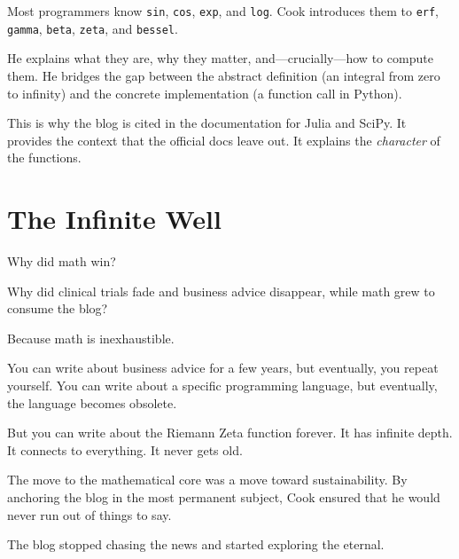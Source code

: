 Most programmers know \texttt{sin}, \texttt{cos}, \texttt{exp}, and \texttt{log}.
Cook introduces them to \texttt{erf}, \texttt{gamma}, \texttt{beta}, \texttt{zeta}, and \texttt{bessel}.

He explains what they are, why they matter, and---crucially---how to compute them. He bridges the gap between the abstract definition (an integral from zero to infinity) and the concrete implementation (a function call in Python).

This is why the blog is cited in the documentation for Julia and SciPy. It provides the context that the official docs leave out. It explains the \textit{character} of the functions.

\bigskip

\section*{The Infinite Well}

Why did math win?

Why did clinical trials fade and business advice disappear, while math grew to consume the blog?

Because math is inexhaustible.

You can write about business advice for a few years, but eventually, you repeat yourself. You can write about a specific programming language, but eventually, the language becomes obsolete.

But you can write about the Riemann Zeta function forever. It has infinite depth. It connects to everything. It never gets old.

The move to the mathematical core was a move toward sustainability. By anchoring the blog in the most permanent subject, Cook ensured that he would never run out of things to say.

The blog stopped chasing the news and started exploring the eternal.

